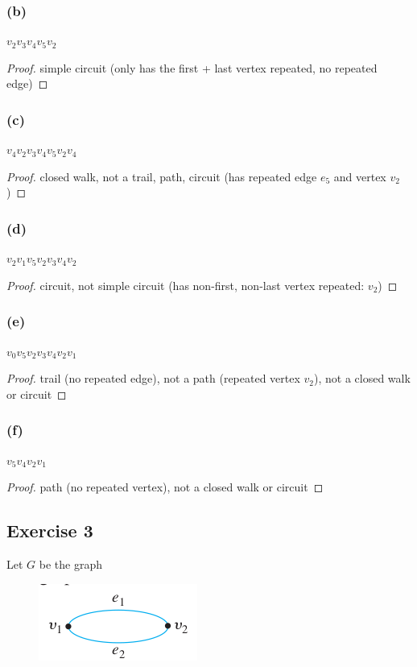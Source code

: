\documentclass[14pt]{extarticle}
\begin{document}
\subsubsection{(b)}
\(v_2v_3v_4v_5v_2\)
\begin{proof}
simple circuit (only has the first + last vertex repeated, no repeated edge)
\end{proof}

\subsubsection{(c)}
\(v_4v_2v_3v_4v_5v_2v_4\)
\begin{proof}
closed walk, not a trail, path, circuit (has repeated edge \(e_5\) and vertex \(v_2\))
\end{proof}

\subsubsection{(d)}
\(v_2v_1v_5v_2v_3v_4v_2\)
\begin{proof}
circuit, not simple circuit (has non-first, non-last vertex repeated: \(v_2\))
\end{proof}

\subsubsection{(e)}
\(v_0v_5v_2v_3v_4v_2v_1\)
\begin{proof}
trail (no repeated edge), not a path (repeated vertex \(v_2\)), not a closed walk or circuit 
\end{proof}

\subsubsection{(f)}
\(v_5v_4v_2v_1\)

\begin{proof}
path (no repeated vertex), not a closed walk or circuit
\end{proof}

\subsection{Exercise 3}
Let \(G\) be the graph

\begin{figure}[ht!]
\centering
\includegraphics[scale=0.4]{../images/10.1.3.png}
\end{figure}
\end{document}
